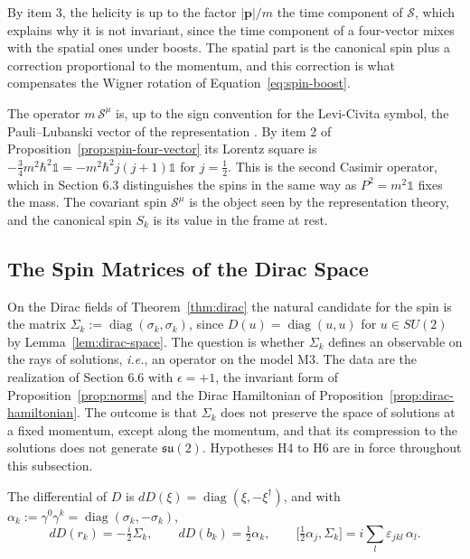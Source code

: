 By item 3, the helicity is up to the factor $|\mathbf{p}|/m$ the time component of $\mathcal{S}$, which explains why it is not invariant, since the time component of a four-vector mixes with the spatial ones under boosts. The spatial part is the canonical spin plus a correction proportional to the momentum, and this correction is what compensates the Wigner rotation of Equation~\eqref{eq:spin-boost}.

\begin{remark}\label{rem:pauli-lubanski}
	The operator $m\,\mathcal{S}^\mu$ is, up to the sign convention for the Levi-Civita symbol, the Pauli--Lubanski vector of the representation \cite[TODO-location]{TODO-BarutRaczka}. By item 2 of Proposition~\ref{prop:spin-four-vector} its Lorentz square is $-\frac34m^2\hbar^2\mathbb{1}=-m^2\hbar^2j(j+1)\mathbb{1}$ for $j=\frac12$. This is the second Casimir operator, which in Section 6.3 distinguishes the spins in the same way as $P^2=m^2\mathbb{1}$ fixes the mass. The covariant spin $\mathcal{S}^\mu$ is the object seen by the representation theory, and the canonical spin $S_k$ is its value in the frame at rest.
\end{remark}

\subsection{The Spin Matrices of the Dirac Space}
\label{subsec:dirac-spin}

On the Dirac fields of Theorem~\ref{thm:dirac} the natural candidate for the spin is the matrix $\Sigma_k:=\operatorname{diag}(\sigma_k,\sigma_k)$, since $D(u)=\operatorname{diag}(u,u)$ for $u\in SU(2)$ by Lemma~\ref{lem:dirac-space}. The question is whether $\Sigma_k$ defines an observable on the rays of solutions, \textit{i.e.}, an operator on the model M3. The data are the realization of Section 6.6 with $\epsilon=+1$, the invariant form of Proposition~\ref{prop:norms} and the Dirac Hamiltonian of Proposition~\ref{prop:dirac-hamiltonian}. The outcome is that $\Sigma_k$ does not preserve the space of solutions at a fixed momentum, except along the momentum, and that its compression to the solutions does not generate $\mathfrak{su}(2)$. Hypotheses H4 to H6 are in force throughout this subsection.

\begin{lemma}\label{lem:dirac-tensor}
	The differential of $D$ is $dD(\xi)=\operatorname{diag}(\xi,-\xi^\dagger)$, and with $\alpha_k:=\gamma^0\gamma^k=\operatorname{diag}(\sigma_k,-\sigma_k)$,
	\begin{equation*}
		dD(r_k)=-\tfrac i2\Sigma_k,\qquad dD(b_k)=\tfrac12\alpha_k,\qquad \big[\tfrac12\alpha_j,\Sigma_k\big]=i\sum_l\varepsilon_{jkl}\,\alpha_l.
	\end{equation*}
\end{lemma}

